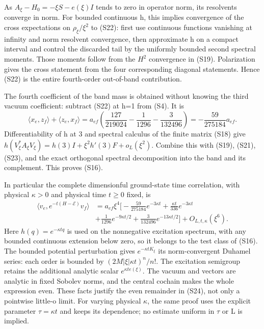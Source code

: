 As \(A_\xi-H_0=-\xi S-e(\xi)I\) tends to zero in operator norm, its resolvents converge in norm. For bounded continuous h, this implies convergence of the cross expectations on \(\rho_\xi/\xi^2\) to (S22): first use continuous functions vanishing at infinity and norm resolvent convergence, then approximate h on a compact interval and control the discarded tail by the uniformly bounded second spectral moments. Those moments follow from the \(H^2\) convergence in (S19). Polarization gives the cross statement from the four corresponding diagonal statements. Hence (S22) is the entire fourth-order out-of-band contribution.

The fourth coefficient of the band mass is obtained without knowing the third vacuum coefficient: subtract (S22) at h=1 from (S4). It is \[
 \langle x_e,z_f\rangle+\langle z_e,x_f\rangle
 =a_{ef}\left(\frac{127}{219024}-\frac1{1296}-\frac3{132496}\right)
 =-\frac{59}{275184}a_{ef}.
\tag{S23}
\] Differentiability of h at 3 and spectral calculus of the finite matrix (S18) give \(h(V_\xi^*A_\xi V_\xi)=h(3)I+\xi^2h'(3)F+o_L(\xi^2)\). Combine this with (S19), (S21), (S23), and the exact orthogonal spectral decomposition into the band and its complement. This proves (S16).

In particular the complete dimensionful ground-state time correlation, with physical \(\kappa>0\) and physical time \(t\ge0\) fixed, is \[
\boxed{\begin{aligned}
 \langle v_e,e^{-t(H-\mathcal E)}v_f\rangle
 &=a_{ef}\xi^4\biggl[-\frac{59}{275184}e^{-3\kappa t}
       +\frac{\kappa t}{336}e^{-3\kappa t}\\
       &+\frac1{1296}e^{-9\kappa t/2}
       +\frac3{132496}e^{-13\kappa t/2}\biggr]+O_{L,t,\kappa}(\xi^6).
\end{aligned}}
\tag{S24}
\] Here \(h(q)=e^{-\kappa tq}\) is used on the nonnegative excitation spectrum, with any bounded continuous extension below zero, so it belongs to the test class of (S16). The bounded potential perturbation gives \(e^{-\kappa tK_\xi}\) its norm-convergent Duhamel series: each order is bounded by \((2M|\xi|\kappa t)^n/n!\). The excitation semigroup retains the additional analytic scalar \(e^{\kappa t e(\xi)}\). The vacuum and vectors are analytic in fixed Sobolev norms, and the central cochain makes the whole expression even. These facts justify the even remainder in (S24), not only a pointwise little-o limit. For varying physical \(\kappa\), the same proof uses the explicit parameter \(\tau=\kappa t\) and keeps its dependence; no estimate uniform in \(\tau\) or L is implied.

